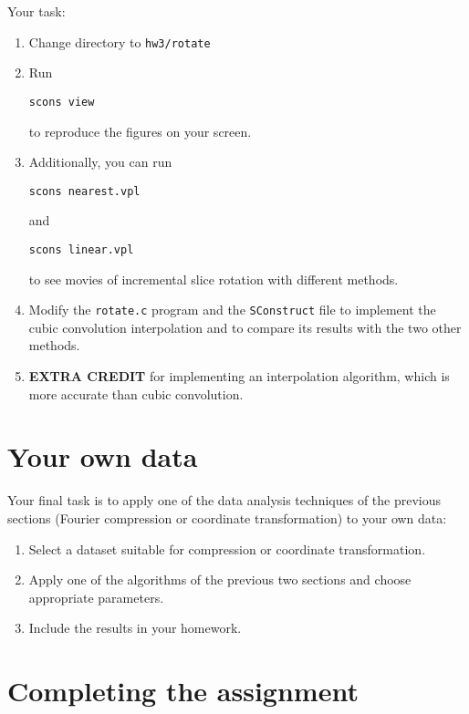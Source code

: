 Your task:
\begin{enumerate}
\item Change directory to \texttt{hw3/rotate}
\item Run 
\begin{verbatim}
scons view
\end{verbatim}
to reproduce the figures on your screen.
\item Additionally, you can run
\begin{verbatim}
scons nearest.vpl
\end{verbatim}
and
\begin{verbatim}
scons linear.vpl
\end{verbatim}
to see movies of incremental slice rotation with different methods.
\item Modify the \texttt{rotate.c} program and the \texttt{SConstruct} file to implement 
the cubic convolution interpolation and to compare 
its results with the two other methods.
\item \textbf{EXTRA CREDIT} for implementing an interpolation algorithm, which 
is more accurate than cubic convolution.
\end{enumerate}

\section{Your own data}

Your final task is to apply one of the data analysis techniques of the
previous sections (Fourier compression or coordinate transformation) to your own data:
\begin{enumerate}
\item Select a dataset suitable for compression or coordinate transformation. 
\item Apply one of the algorithms of the previous two sections and choose appropriate parameters.
\item Include the results in your homework.
\end{enumerate}


\section{Completing the assignment}

